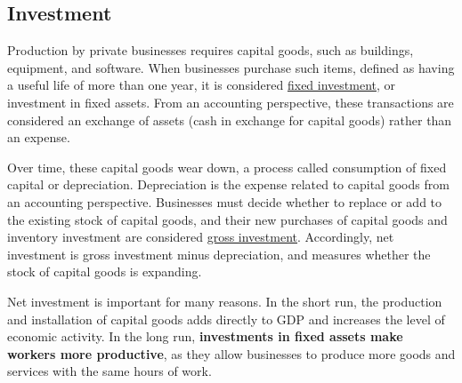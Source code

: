 \documentclass{report}
\begin{document}
{\begin{minipage}{0.76\textwidth}
\subsection*{Investment}
\hypertarget{busin}{}
\small Production by private businesses requires capital goods, such as buildings, equipment, and software. When businesses purchase such items, defined as having a useful life of more than one year, it is considered \href{https://www.bea.gov/help/glossary/nonresidential-fixed-investment}{fixed investment}, or investment in fixed assets. From an accounting perspective, these transactions are considered an exchange of assets (cash in exchange for capital goods) rather than an expense.

Over time, these capital goods wear down, a process called consumption of fixed capital or depreciation. Depreciation is the expense related to capital goods from an accounting perspective. Businesses must decide whether to replace or add to the existing stock of capital goods, and their new purchases of capital goods and inventory investment are considered \href{https://www.bea.gov/help/glossary/gross-private-domestic-investment}{gross investment}. Accordingly, net investment is gross investment minus depreciation, and measures whether the stock of capital goods is expanding.

Net investment is important for many reasons. In the short run, the production and installation of capital goods adds directly to GDP and increases the level of economic activity. In the long run, \textbf{investments in fixed assets make workers more productive}, as they allow businesses to produce more goods and services with the same hours of work. 
\end{minipage}
\vspace{1mm}

}
\end{document}
